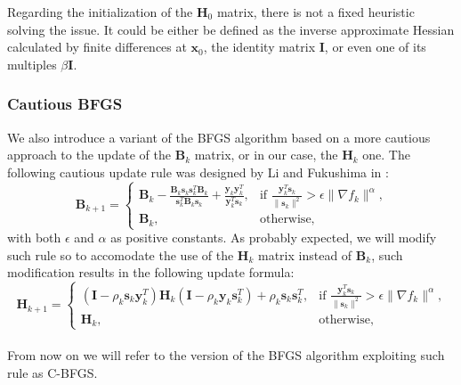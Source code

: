 \documentclass{article}
\numberwithin{equation}{section}
\begin{document}
Regarding the initialization of the $\boldsymbol{H}_0$ matrix, there is not a fixed heuristic solving the issue. It could be either be defined as the inverse approximate Hessian calculated by finite differences at $\boldsymbol{x}_0$, the identity matrix $\boldsymbol{I}$, or even one of its multiples $\beta \boldsymbol{I}$. 

\subsubsection{Cautious BFGS}
We also introduce a variant of the BFGS algorithm based on a more cautious approach to the update of the $\boldsymbol{B}_k$ matrix, or in our case, the $\boldsymbol{H}_k$ one. The following cautious update rule was designed by Li and Fukushima in \cite{LiFukushimaA}:
\begin{equation*}
\boldsymbol{B}_{k+1}=\begin{cases}
			\boldsymbol{B}_k - \frac{\boldsymbol{B}_k \boldsymbol{s}_k \boldsymbol{s}_k^T \boldsymbol{B}_k}{\boldsymbol{s}_k^T \boldsymbol{B}_k \boldsymbol{s}_k} + \frac{\boldsymbol{y}_k \boldsymbol{y}_k^T}{\boldsymbol{y}_k^T \boldsymbol{s}_k}, & \text{if $\frac{\boldsymbol{y}_k^T \boldsymbol{s}_k}{\| \boldsymbol{s}_k\|^2} > \epsilon \| \nabla f_k\|^\alpha$,}\\
            \boldsymbol{B}_k, & \text{otherwise},
		 \end{cases}
\end{equation*}
with both $\epsilon$ and $\alpha$ as positive constants. As probably expected, we will modify such rule so to accomodate the use of the $\boldsymbol{H}_k$ matrix instead of $\boldsymbol{B}_k$, such modification results in the following update formula:
\begin{equation}\label{eq:c-update}
\boldsymbol{H}_{k+1}=\begin{cases}
			(\boldsymbol{I} - \rho_k \boldsymbol{s}_k \boldsymbol{y}^T_k) \boldsymbol{H}_k (\boldsymbol{I} - \rho_k \boldsymbol{y}_k \boldsymbol{s}^T_k ) + \rho_k \boldsymbol{s}_k \boldsymbol{s}^T_k, & \text{if $\frac{\boldsymbol{y}_k^T \boldsymbol{s}_k}{\| \boldsymbol{s}_k\|^2} > \epsilon \| \nabla f_k\|^\alpha$,}\\
            \boldsymbol{H}_k, & \text{otherwise},
		 \end{cases}
\end{equation}\\
From now on we will refer to the version of the BFGS algorithm exploiting such rule as C-BFGS. 
\end{document}

